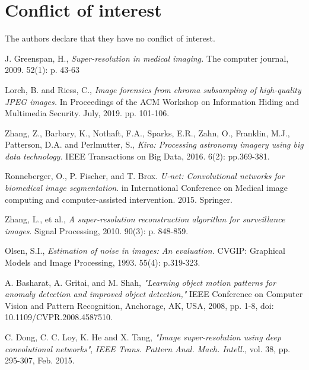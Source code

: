 \documentclass[twocolumn]{svjour3}          %
\begin{document}

\section*{Conflict of interest}
 The authors declare that they have no conflict of interest.

\begin{thebibliography}{00}

 J. Greenspan, H., \textit{Super-resolution in medical imaging.} The computer journal, 2009. 52(1): p. 43-63

 Lorch, B. and Riess, C., \textit{Image forensics from chroma subsampling of high-quality JPEG images.} In Proceedings of the ACM Workshop on Information Hiding and Multimedia Security. July, 2019. pp. 101-106.

 Zhang, Z., Barbary, K., Nothaft, F.A., Sparks, E.R., Zahn, O., Franklin, M.J., Patterson, D.A. and Perlmutter, S.,  \textit{Kira: Processing astronomy imagery using big data technology.} IEEE Transactions on Big Data, 2016. 6(2): pp.369-381.

 Ronneberger, O., P. Fischer, and T. Brox. \textit{U-net: Convolutional networks for biomedical image segmentation}. in International Conference on Medical image computing and computer-assisted intervention. 2015. Springer.

 Zhang, L., et al., \textit{A super-resolution reconstruction algorithm for surveillance images}. Signal Processing, 2010. 90(3): p. 848-859.

 Olsen, S.I., \textit{Estimation of noise in images: An evaluation.} CVGIP: Graphical Models and Image Processing, 1993. 55(4):  p.319-323.

 A. Basharat, A. Gritai, and M. Shah, \textit{"Learning object motion patterns for anomaly detection and improved object detection,"} IEEE Conference on Computer Vision and Pattern Recognition, Anchorage, AK, USA, 2008, pp. 1-8, doi: 10.1109/CVPR.2008.4587510.

 C. Dong, C. C. Loy, K. He and X. Tang, \textit{"Image super-resolution using deep convolutional networks"}, \textit{IEEE Trans. Pattern Anal. Mach. Intell.}, vol. 38, pp. 295-307, Feb. 2015.


\end{thebibliography}
\end{document}
